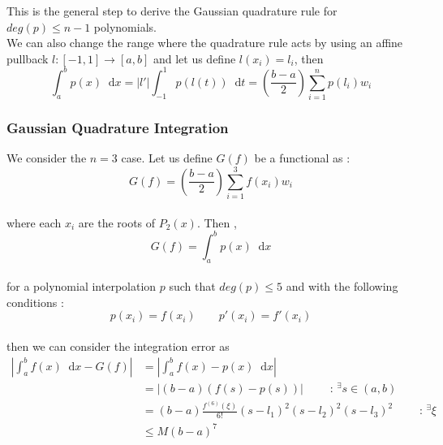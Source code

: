 \documentclass[paper=a4, fontsize=11pt]{scrartcl}
\newcommand*\dif{\mathop{}\!\mathrm{d}}
\begin{document}
This is the general step to derive the Gaussian quadrature rule for $deg(p)\leq n-1$ polynomials.\\

We can also change the range where the quadrature rule acts by using an affine pullback $l:[-1,1]\to[a,b]$ and let us define $l(x_i)=l_i$, then \\

\begin{equation}\nonumber
	\int_{a}^{b} p(x) \dif x = |l'| \int_{-1}^{1} p(l(t)) \dif t = \left( \frac{b-a}{2} \right)  \sum_{i=1}^{n} p(l_i) w_i
\end{equation}

\vspace{0.15in}
\subsubsection{Gaussian Quadrature Integration}
\vspace{0.15in}

We consider the $n=3$ case. Let us define $G(f)$ be a functional as :\\

\begin{equation}\nonumber
	G(f) = \left( \frac{b-a}{2} \right)  \sum_{i=1}^{3} f(x_i) w_i
\end{equation}\\

where each $x_i$ are the roots of $P_2(x)$. Then , \\

\begin{equation}\nonumber
	G(f) = \int_{a}^{b} p(x) \dif x
\end{equation}\\

for a polynomial interpolation $p$ such that $deg(p)\leq5$ and with the following conditions : \\

\begin{equation}\nonumber
	p(x_i)=f(x_i) \qquad p'(x_i)=f'(x_i)
\end{equation}\\

then we can consider the integration error as \\

\begin{equation}\nonumber
\begin{split}
	\left| \int_{a}^{b} f(x)\dif x -G(f) \right| &= \left| \int_{a}^{b} f(x) - p(x) \dif x  \right|  \\[2.5ex]
	&= \left| (b-a)(f(s)-p(s)) \right| \qquad \text{ : } ^\exists s \in (a,b) \\[2.5ex]
	&= (b-a) \frac{f^{(6)}(\xi)}{6!}(s-l_1)^2(s-l_2)^2(s-l_3)^2 \qquad \text{ : } ^\exists \xi \\[2.5ex]
	&\leq M (b-a)^7
\end{split}
\end{equation}\\
\end{document}
